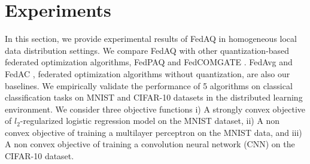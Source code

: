 \section{Experiments}
\label{experiment}

In this section, we provide experimental results of FedAQ in homogeneous local data distribution settings. We compare FedAQ with other quantization-based federated optimization algorithms, FedPAQ \cite{reisizadeh2020fedpaq} and FedCOMGATE \cite{haddadpour2021federated}. FedAvg \cite{mcmahan2017communication} and FedAC \cite{yuan2020federated}, federated optimization algorithms without quantization, are also our baselines. We empirically validate the performance of 5 algorithms on classical classification tasks on MNIST\cite{lecun1998mnist} and CIFAR-10\cite{krizhevsky2009learning} datasets in the distributed learning environment. We consider three objective functions i) A strongly convex objective of $l_2$-regularized logistic regression model on the MNIST dataset, ii) A non convex objective of training a multilayer perceptron on the MNIST data, and iii) A non convex objective of training a convolution neural network (CNN) on the CIFAR-10 dataset. %


